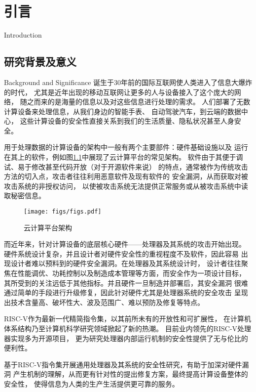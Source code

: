 
\chapter{引言}{Introduction}


\section{研究背景及意义}{Background and Significance}
诞生于30年前的国际互联网使人类进入了信息大爆炸的时代，
尤其是近年出现的移动互联网让更多的人与设备接入了这个庞大的网络，
随之而来的是海量的信息以及对这些信息进行处理的需求。
人们部署了无数计算设备来处理信息，从我们身边的智能手表、
自动驾驶汽车，到云端的数据中心，
这些计算设备的安全性直接关系到我们的生活质量、隐私状况甚至人身安全。

用于处理数据的计算设备的架构中一般有两个主要部件：硬件基础设施以及
运行在其上的软件，例如图\ref{fig:cloud-arch}中展现了云计算平台的常见架构。
软件由于其便于调试、易于修改甚至代码开放（对于开源软件来说）
的特点，通常被作为传统攻击方法的切入点，攻击者往往利用恶意软件及现有软件的
安全漏洞，从而获取对被攻击系统的非授权访问，
以使被攻击系统无法提供正常服务或从被攻击系统中读取秘密信息。\cite{sw_attack}

\begin{figure}[ht]
	\centering
	\texttt{[image: figs/figs.pdf]}
	\caption{云计算平台架构}
	\label{fig:cloud-arch}
\end{figure}

而近年来，针对计算设备的底层核心硬件——处理器及其系统的攻击开始出现。
硬件系统设计复杂，并且设计者对硬件安全性的重视程度不及软件，因此容易
出现设计者难以预料到的硬件安全漏洞。在处理器及其系统设计时，
设计者往往聚焦在性能调优、功耗控制以及制造成本管理等方面，而安全作为一项设计目标，
其所受到的关注远低于其他指标。并且硬件一旦制造并部署后，其安全漏洞
很难通过简单的手段进行升级修复，因此针对硬件尤其是处理器系统的安全攻击
呈现出技术含量高、破坏性大、波及范围广、难以预防及修复等特点。

RISC-V作为最新一代精简指令集，以其前所未有的开放性和可扩展性，
在计算机体系结构乃至计算机科学研究领域掀起了新的热潮。
目前业内领先的RISC-V处理器实现多为开源项目，
更为研究处理器内部运行机制的安全性提供了无与伦比的便利性。

基于RISC-V指令集开展通用处理器及其系统的安全性研究，有助于加深对硬件漏洞
产生机制的理解，从而更有针对性的提出修复方案，最终提高计算设备整体的安全性，
使得信息为人类的生产生活提供更可靠的服务。



